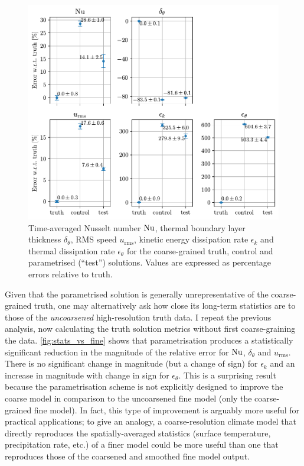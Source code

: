 \documentclass[../main.tex]{subfiles}
\begin{document}
\begin{figure}[ht]
    \centering
    \includegraphics[width=0.7\linewidth]{figures/stats.pdf}
    \caption{
        Time-averaged Nusselt number $\mathrm{Nu}$, thermal boundary layer
        thickness $\delta_\theta$, RMS speed $u_\mathrm{rms}$, kinetic energy
        dissipation rate $\epsilon_k$ and thermal dissipation rate
        $\epsilon_\theta$ for the coarse-grained truth, control and
        parametrised (``test'') solutions. Values are expressed as percentage
        errors relative to truth.
    }
    \label{fig:stats}
\end{figure}

Given that the parametrised solution is generally unrepresentative of the
coarse-grained truth, one may alternatively ask how close its long-term
statistics are to those of the \emph{uncoarsened} high-resolution truth data. I
repeat the previous analysis, now calculating the truth solution metrics
without first coarse-graining the data. \cref{fig:stats_vs_fine} shows that
parametrisation produces a statistically significant reduction in the magnitude
of the relative error for $\mathrm{Nu}$, $\delta_\theta$ and $u_\mathrm{rms}$.
There is no significant change in magnitude (but a change of sign) for
$\epsilon_k$ and an increase in magnitude with change in sign for
$\epsilon_\theta$. This is a surprising result because the parametrisation
scheme is not explicitly designed to improve the coarse model in comparison to
the uncoarsened fine model (only the coarse-grained fine model). In fact, this
type of improvement is arguably more useful for practical applications; to give
an analogy, a coarse-resolution climate model that directly reproduces the
spatially-averaged statistics (surface temperature, precipitation rate, etc.)
of a finer model could be more useful than one that reproduces those of the
coarsened and smoothed fine model output.
\end{document}
